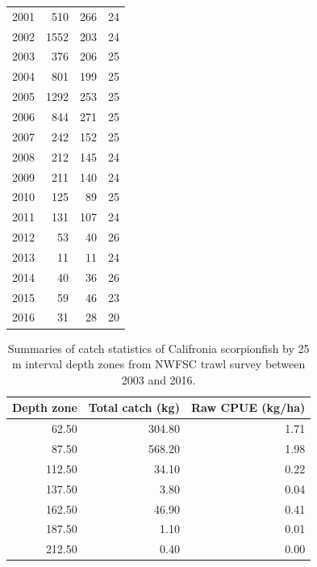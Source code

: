 \documentclass[12pt,]{article}
\begin{document}
\begin{table}[ht]
{\begin{tabular}{rrrr}
  2001 & 510 & 266 & 24 \\ 
  2002 & 1552 & 203 & 24 \\ 
  2003 & 376 & 206 & 25 \\ 
  2004 & 801 & 199 & 25 \\ 
  2005 & 1292 & 253 & 25 \\ 
  2006 & 844 & 271 & 25 \\ 
  2007 & 242 & 152 & 25 \\ 
  2008 & 212 & 145 & 24 \\ 
  2009 & 211 & 140 & 24 \\ 
  2010 & 125 & 89 & 25 \\ 
  2011 & 131 & 107 & 24 \\ 
  2012 & 53 & 40 & 26 \\ 
  2013 & 11 & 11 & 24 \\ 
  2014 & 40 & 36 & 26 \\ 
  2015 & 59 & 46 & 23 \\ 
  2016 & 31 & 28 & 20 \\ 
   \hline
\end{tabular}
}
\end{table}

\FloatBarrier

\begin{table}[ht]
\centering
\caption{Summaries of catch statistics of 
                                          Califronia scorpionfish by 25 m interval depth zones 
                                          from NWFSC trawl survey between 2003 and 2016.} 
\label{tab:Fleet8_NWFSCTrawl_catchdepth}
\begin{tabular}{rrr}
  \hline
Depth zone & Total catch (kg) & Raw CPUE (kg/ha) \\ 
  \hline
62.50 & 304.80 & 1.71 \\ 
  87.50 & 568.20 & 1.98 \\ 
  112.50 & 34.10 & 0.22 \\ 
  137.50 & 3.80 & 0.04 \\ 
  162.50 & 46.90 & 0.41 \\ 
  187.50 & 1.10 & 0.01 \\ 
  212.50 & 0.40 & 0.00 \\ 
   \hline
\end{tabular}
\end{table}\vspace{2in}
\end{document}
